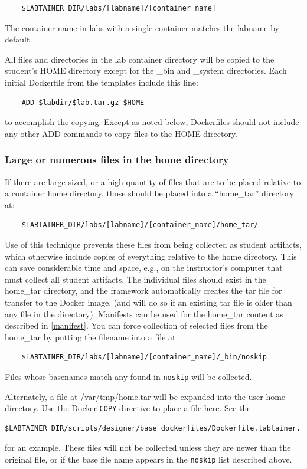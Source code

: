 \documentclass[12pt]{article}
\begin{document}
\begin{verbatim}
    $LABTAINER_DIR/labs/[labname]/[container name]
\end{verbatim}
The container name in labs with a single container matches the labname by default.

All files and directories in the lab container directory will be copied to the student's HOME
directory except for the \_bin and \_system directories.
Each initial Dockerfile from the templates include this line:
\begin{verbatim}
    ADD $labdir/$lab.tar.gz $HOME
\end{verbatim}
to accomplish the copying. Except as noted below, Dockerfiles should not include any other ADD commands
to copy files to the HOME directory.
\subsubsection{Large or numerous files in the home directory} \label{large files}
If there are large sized, or a high quantity of files that are to be placed relative to a 
container home directory, those should be placed into a ``home\_tar'' directory at:
\begin{verbatim}
    $LABTAINER_DIR/labs/[labname]/[container_name]/home_tar/
\end{verbatim}
\noindent Use of this technique prevents these files from being collected as student artifacts, which
otherwise include copies of everything relative to the home directory.  This
can save considerable time and space, e.g., on the instructor's computer that must collect
all student artifacts.
The individual files should exist in the home\_tar directory, and the framework automatically
creates the tar file for transfer to the Docker image, (and will do so if an existing tar file
is older than any file in the directory).  Manifests can be used for the home\_tar content
as described in \ref{manifest}.  You can force collection of selected files from the home\_tar
by putting the filename into a file at:
\begin{verbatim}
    $LABTAINER_DIR/labs/[labname]/[container_name]/_bin/noskip
\end{verbatim}
\noindent  Files whose basenames match any found in {\tt noskip} will be collected.

Alternately, a file at /var/tmp/home.tar will be expanded into the user home directory.
Use the Docker {\tt COPY} directive to place a file here.  See the 
\begin{verbatim}
$LABTAINER_DIR/scripts/designer/base_dockerfiles/Dockerfile.labtainer.firefox
\end{verbatim}
for an example.  These files will not be collected unless they are newer than the original file,
or if the base file name appears in the {\tt noskip} list described above.
\end{document}
